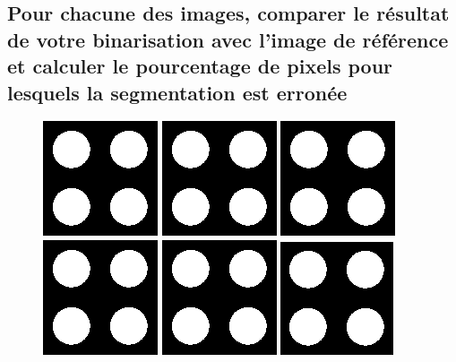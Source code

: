\documentclass[a4paper,12pt]{report}
\begin{document}
\subsection*{Pour chacune des images, comparer le résultat de votre binarisation avec l'image de référence et calculer le pourcentage de pixels pour lesquels la segmentation est erronée}

\begin{figure}[!ht]
	\center
	\includegraphics[scale=0.3]{../rdf-masque-ronds.png}
	\includegraphics[scale=0.3]{../rdf-masque-ronds.png}
	\includegraphics[scale=0.3]{../rdf-masque-ronds.png}
	\includegraphics[scale=0.3]{../rdf-masque-ronds.png}
	\includegraphics[scale=0.3]{../rdf-masque-ronds.png}
	\center
	\includegraphics[scale=0.3]{image/text01.png}

\end{figure}
\end{document}

